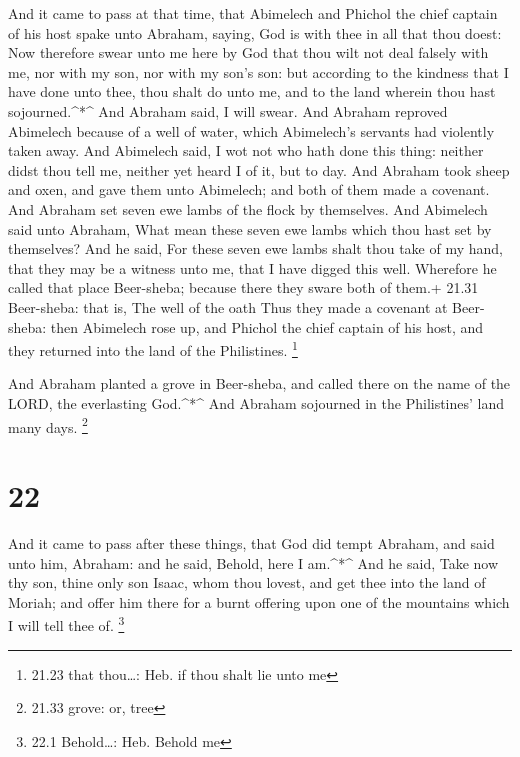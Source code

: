  And it came to pass at that time, that Abimelech and
Phichol the chief captain of his host spake unto Abraham, saying, God is
with thee in all that thou doest:  Now therefore swear unto
me here by God that thou wilt not deal falsely with me, nor with my son,
nor with my son's son: but according to the kindness that I have done
unto thee, thou shalt do unto me, and to the land wherein thou hast
sojourned.\^{}*\^{}  And Abraham said, I will swear.
 And Abraham reproved Abimelech because of a well of water,
which Abimelech's servants had violently taken away.  And
Abimelech said, I wot not who hath done this thing: neither didst thou
tell me, neither yet heard I of it, but to day.  And
Abraham took sheep and oxen, and gave them unto Abimelech; and both of
them made a covenant.  And Abraham set seven ewe lambs of
the flock by themselves.  And Abimelech said unto Abraham,
What mean these seven ewe lambs which thou hast set by themselves?
 And he said, For these seven ewe lambs shalt thou take of
my hand, that they may be a witness unto me, that I have digged this
well.  Wherefore he called that place Beer-sheba; because
there they sware both of them.+ 21.31 Beer-sheba: that is, The well of
the oath  Thus they made a covenant at Beer-sheba: then
Abimelech rose up, and Phichol the chief captain of his host, and they
returned into the land of the Philistines. \footnote{21.23 that
  thou\ldots: Heb. if thou shalt lie unto me}

 And Abraham planted a grove in Beer-sheba, and called
there on the name of the LORD, the everlasting God.\^{}*\^{}
 And Abraham sojourned in the Philistines' land many days.
\footnote{21.33 grove: or, tree}

\hypertarget{section-21}{%
\section{22}\label{section-21}}

 And it came to pass after these things, that God did tempt
Abraham, and said unto him, Abraham: and he said, Behold, here I
am.\^{}*\^{}  And he said, Take now thy son, thine only son
Isaac, whom thou lovest, and get thee into the land of Moriah; and offer
him there for a burnt offering upon one of the mountains which I will
tell thee of. \footnote{22.1 Behold\ldots: Heb. Behold me}

